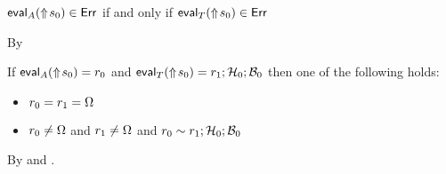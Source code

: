 \vfill
\newpage

\begin{corollary}
  $\mathsf{eval}_{A}(\Uparrow\!s_0) \in \mathsf{Err}$
  if and only if\/
  $\mathsf{eval}_{T}(\Uparrow\!s_0) \in \mathsf{Err}$
\end{corollary}
\begin{lamportproof}
  By 
\end{lamportproof}

\begin{lemma}\label{AT-eval-simulation}
  If\/ $\mathsf{eval}_{A}(\Uparrow\!s_0) = r_0$
  and\/ $\mathsf{eval}_{T}(\Uparrow\!s_0) = r_1; \mathcal{H}_0; \mathcal{B}_0$
  then one of the following holds:
  \begin{itemize}
    \item
      $r_0 = r_1 = \Omega$
    \item
      $r_0 \neq \Omega$
      and\/ $r_1 \neq \Omega$
      and\/ $r_0 \sim r_1; \mathcal{H}_0; \mathcal{B}_0$
  \end{itemize}
\end{lemma}
\begin{lamportproof}
  By  and .
\end{lamportproof}

